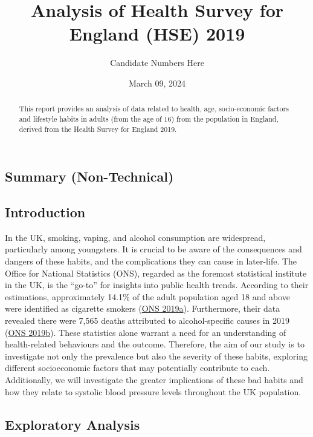 \documentclass[
  11pt,
]{article}
\title{Analysis of Health Survey for England (HSE) 2019}
\author{Candidate Numbers Here}
\date{March 09, 2024}
\begin{document}
\maketitle
\begin{abstract}
This report provides an analysis of data related to health, age,
socio-economic factors and lifestyle habits in adults (from the age of
16) from the population in England, derived from the Health Survey for
England 2019.
\end{abstract}


\newpage

\hypertarget{summary-non-technical}{%
\subsection{Summary (Non-Technical)}\label{summary-non-technical}}

\hypertarget{introduction}{%
\subsection{Introduction}\label{introduction}}

In the UK, smoking, vaping, and alcohol consumption are widespread,
particularly among youngsters. It is crucial to be aware of the
consequences and dangers of these habits, and the complications they can
cause in later-life. The Office for National Statistics (ONS), regarded
as the foremost statistical institute in the UK, is the ``go-to'' for
insights into public health trends. According to their estimations,
approximately 14.1\% of the adult population aged 18 and above were
identified as cigarette smokers (\protect\hyperlink{ref-1ONS}{ONS
2019a}). Furthermore, their data revealed there were 7,565 deaths
attributed to alcohol-specific causes in 2019
(\protect\hyperlink{ref-2ONS}{ONS 2019b}). These statistics alone
warrant a need for an understanding of health-related behaviours and the
outcome. Therefore, the aim of our study is to investigate not only the
prevalence but also the severity of these habits, exploring different
socioeconomic factors that may potentially contribute to each.
Additionally, we will investigate the greater implications of these bad
habits and how they relate to systolic blood pressure levels throughout
the UK population.

\hypertarget{exploratory-analysis}{%
\subsection{Exploratory Analysis}\label{exploratory-analysis}}
\end{document}
